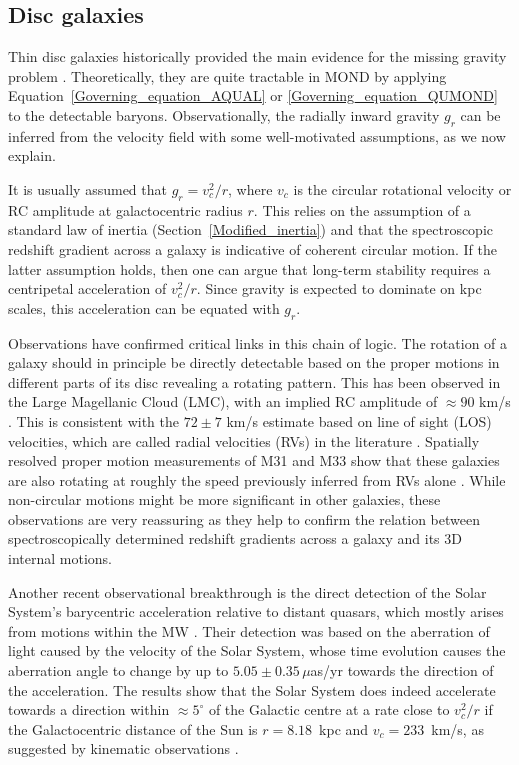 \documentclass[fleqn,usenatbib,useAMS]{mnras} %
\begin{document}
\subsection{Disc galaxies}
\label{Disc_galaxies}

Thin disc galaxies historically provided the main evidence for the missing gravity problem \citep[as reviewed in][]{Faber_1979}. Theoretically, they are quite tractable in MOND by applying Equation~\ref{Governing_equation_AQUAL} or \ref{Governing_equation_QUMOND} to the detectable baryons. Observationally, the radially inward gravity $g_r$ can be inferred from the velocity field with some well-motivated assumptions, as we now explain.

It is usually assumed that $g_r = v_c^2/r$, where $v_c$ is the circular rotational velocity or RC amplitude at galactocentric radius $r$. This relies on the assumption of a standard law of inertia (Section~\ref{Modified_inertia}) and that the spectroscopic redshift gradient across a galaxy is indicative of coherent circular motion. If the latter assumption holds, then one can argue that long-term stability requires a centripetal acceleration of $v_c^2/r$. Since gravity is expected to dominate on kpc scales, this acceleration can be equated with $g_r$.

Observations have confirmed critical links in this chain of logic. The rotation of a galaxy should in principle be directly detectable based on the proper motions in different parts of its disc revealing a rotating pattern. This has been observed in the Large Magellanic Cloud (LMC), with an implied RC amplitude of $\approx 90$ km/s \citep{Van_der_Marel_2014, Van_der_Marel_2016, Vasiliev_2018}. This is consistent with the $72 \pm 7$ km/s estimate based on line of sight (LOS) velocities, which are called radial velocities (RVs) in the literature \citep{Alves_2000}. Spatially resolved proper motion measurements of M31 and M33 show that these galaxies are also rotating at roughly the speed previously inferred from RVs alone \citep{Van_der_Marel_2019}. While non-circular motions might be more significant in other galaxies, these observations are very reassuring as they help to confirm the relation between spectroscopically determined redshift gradients across a galaxy and its 3D internal motions.

Another recent observational breakthrough is the direct detection of the Solar System's barycentric acceleration relative to distant quasars, which mostly arises from motions within the MW \citep{Klioner_2021}. Their detection was based on the aberration of light caused by the velocity of the Solar System, whose time evolution causes the aberration angle to change by up to $5.05 \pm 0.35 \, \mu$as/yr towards the direction of the acceleration. The results show that the Solar System does indeed accelerate towards a direction within $\approx 5^\circ$ of the Galactic centre at a rate close to $v_c^2/r$ if the Galactocentric distance of the Sun is $r = 8.18$~kpc \citep{Gravity_2019} and $v_c = 233$~km/s, as suggested by kinematic observations \citep[e.g.][]{McMillan_2017, McGaugh_2018}.
\end{document}
